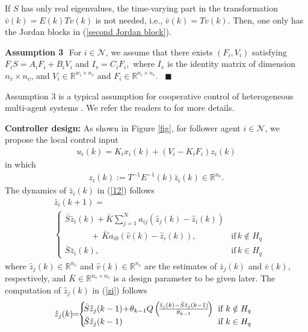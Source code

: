 \documentclass{autart}
\def\qedp{\hspace*{\fill}~{\tiny $\blacksquare$}}
\def\qedp{\hspace*{\fill}~{\tiny $\blacksquare$}}
\begin{document}
If $S$ has only real eigenvalues, the time-varying part in the transformation $\bar v(k) = E(k) T v(k)$ is not needed, i.e., $\bar v(k) = T v(k)$. Then, one only has the Jordan blocks in (\ref{second Jordan block}).


\textbf{Assumption 3}\,\,	For $i \in \mathcal N$, we assume that there exists $(F_i, V_i)$ satisfying
$
F_i S=A_i F_i  + B_i V_i$ and
$I_v 	= C_i F_i,  
$
where $I_v$ is the identity matrix of dimension $n_v\times n_v$, and $V_i \in \mathbb R ^{w_i \times n_v}$ and $F_i \in \mathbb R ^{n_i \times n_v}$.  \qedp

Assumption 3 is a typical assumption for cooperative control of heterogeneous multi-agent systems \cite{li2021cooperative}. We refer the readers to \cite{su2011cooperative} for more details. 

\textbf{Controller design:} As shown in Figure \ref{fig}, for follower agent $i\in \mathcal N$, we propose the local control input
\begin{align}\label{controller0}
u_i(k) = K_i x_i(k) + (V_i - K_i F_i)  z_i (k)
\end{align}
in which
\begin{align}\label{12}
z_i(k):=T^{-1} E^{-1}(k) \bar z_i (k) \in \mathbb R^{n_v}.
\end{align}
The dynamics of $\bar z_i(k)$ in (\ref{12}) follows
\begin{align}\label{zi}
&\bar z_i(k+1) =  \nonumber \\
&\left\{
\begin{array}{ll}
\bar S \bar z_i(k) + \bar K \sum_{j=1} ^{N} a_{ij} (\hat z_j  (k) - \hat z_i  (k)) \\
\quad \quad\quad  + \, \bar K   a_{i0} (  \hat v  (k) -  \hat z_i(k)), &\text{if}\,k \notin H_q \\
\bar S \bar z_i(k), & \text{if}\, k \in H_q
\end{array}
\right.
\end{align}
where $\hat z_j(k)\in \mathbb R ^{n_v}$ and $\hat v(k)\in \mathbb R ^{n_v}$ are the estimates of $\bar z_j(k)$ and $\bar v(k)$, respectively, and $\bar K  \in \mathbb R^ {n_v \times n_v}$ is a design parameter to be given later. 
The computation of $\hat z_j(k)$ in (\ref{zi}) follows
\begin{align}\setlength{\arraycolsep}{3pt}  \label{eq estimator}
\hat  z_j(k)
\!\!=\!\!
\left\{ \!\!\!
\begin{array}{ll}
\bar S \hat  z_j(k-1) \!+\! \theta_{k-1} Q \left(\!  \frac{  \bar z_j(k) -   \bar S \hat  z_j( k-1 )}{\theta_{k-1}} \!  \right)  & \text{if $k \notin H_q$ } \\
\bar S \hat  z_j( k-1  )             & \text{if $k \in  H_q$} 
\end{array}
\right.   
\end{align}
\end{document}
